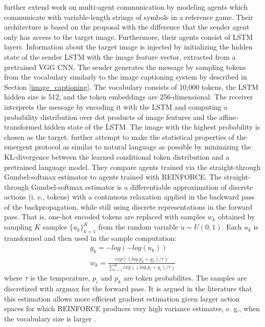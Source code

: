 \cite{havrylov2017emergence} further extend work on multi-agent communication by modeling agents which  communicate with variable-length strings of symbols in a reference game. 
Their architecture is based on the proposal \cite{lazaridou2016multi} with the difference that the sender agent only has access to the target image. Furthermore, their agents consist of LSTM layers. Information about the target image is injected by initializing the hidden state of the sender LSTM with the image feature vector, extracted from a pretrained VGG CNN. The sender generates the message by sampling tokens from the vocabulary similarly to the image captioning system by \cite{vinyals2015show} described in Section \ref{image_captioning}. The vocabulary consists of 10,000 tokens, the LSTM hidden size is 512, and the token embeddings are 256-dimensional. 
The receiver interprets the message by encoding it with the LSTM and computing a probability distribution over dot products of image features and the affine-transformed hidden state of the LSTM. The image with the highest probability is chosen as the target. \cite{havrylov2017emergence} further attempt to make the statistical properties of the emergent protocol as similar to natural language as possible by minimizing the KL-divergence between the learned conditional token distribution and a pretrained language model.
They compare agents trained via the straight-through Gumbel-softmax estimator to agents trained with REINFORCE. The straight-through Gumbel-softmax estimator is a differentiable approximation of discrete actions (i. e., tokens) with a continuous relaxation applied in the backward pass of the backpropagation, while still using discrete representations in the forward pass.
That is, one-hot encoded tokens are replaced with samples $w_k$ obtained by sampling $K$ samples  $\{u_k\}_{k=1}^K$ from the random variable $u \sim U(0,1)$. Each $u_k$ is transformed and then used in the sample computation:
\begin{equation}
\begin{aligned}
g_k = -log(-log(u_k)) \\
w_k = \frac{exp((log \; p_k + g_k) / \tau)}{\sum_{i=1}^{K} exp((log \; p_i + g_i) / \tau)}
\end{aligned}
\end{equation}
where $\tau$ is the temperature, $p_i$ and $p_k$ are token probabilites. The samples are discretized with argmax for the forward pass. 
It is argued in the literature that this estimation allows more efficient gradient estimation given larger action spaces for which REINFORCE produces very high variance estimates, e. g., when the vocabulary size is larger \parencite{havrylov2017emergence}.

